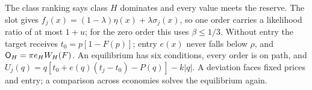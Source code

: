 \begin{chaptersummary}
The class ranking says class \(H\) dominates and every value meets the reserve.
The slot gives \(f_j(x)=(1-\lambda)\eta(x)+\lambda\sigma_j(x)\), so one order carries a likelihood ratio of at most \(1+u\); for the zero order this uses \(\beta\le1/3\).
Without entry the target receives \(t_0=p[1-F(p)]\); entry \(e(x)\) never falls below \(\rho\), and \(\mathsf{O}_H=\pi e_HW_H(F)\).
An equilibrium has six conditions, every order is on path, and \(U_j(q)=q[t_0+e(q)(t_j-t_0)-P(q)]-k|q|\).
A deviation faces fixed prices and entry; a comparison across economies solves the equilibrium again.
\end{chaptersummary}
